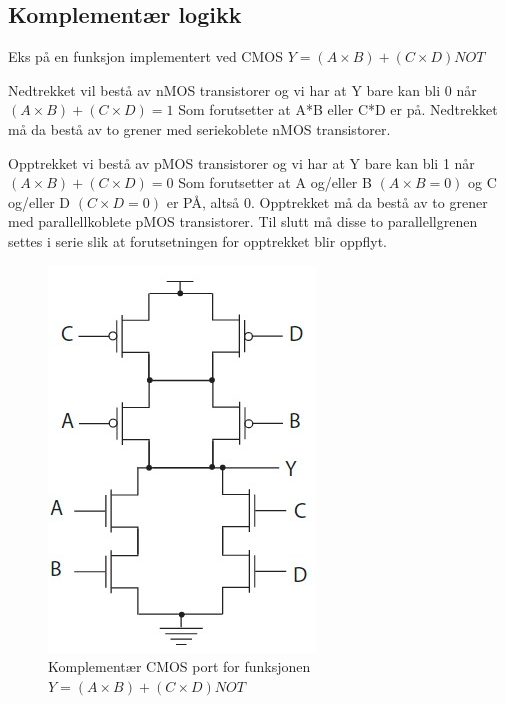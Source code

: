 \documentclass{article}
\begin{document}
	\subsection{Komplementær logikk}
	
	Eks på en funksjon implementert ved CMOS
	$Y = (A \times B) + (C \times D) NOT$
	
	Nedtrekket vil bestå av nMOS transistorer og vi har at Y bare kan bli 0 når $(A \times B) + (C \times D) = 1$ Som forutsetter at A*B eller C*D er på. Nedtrekket må da bestå av to grener med seriekoblete nMOS transistorer.
	
	Opptrekket vi bestå av pMOS transistorer og vi har at Y bare kan bli 1 når $(A \times B) + (C \times D) = 0$ Som forutsetter at A og/eller B $(A \times B = 0)$ og C og/eller D $(C \times D = 0)$ er PÅ, altså 0. Opptrekket må da bestå av to grener med	parallellkoblete pMOS transistorer. Til slutt må disse to parallellgrenen settes i serie slik at forutsetningen for opptrekket blir oppflyt.
	
	\begin{figure}[H]
		\includegraphics[scale = 0.6]{CMOSeks.jpg}
		\caption{Komplementær CMOS port for funksjonen $Y = (A \times B)+(C \times D) NOT$}
	\end{figure}
	
	
	
\end{document}
